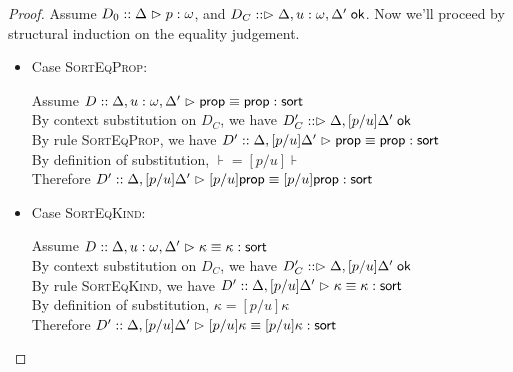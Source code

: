 \begin{proof}
Assume $D_0 :: \judgeA{p}{\omega}$, and $D_C :: \judgeACtx{\Delta, u:\omega, \Delta'}$.  
Now we'll proceed by structural induction on the equality judgement. 
\begin{itemize}
\item Case \textsc{SortEqProp}:
  \begin{tabbedproof}
    \oo Assume $D :: \judgeSortEq[{\Delta, u:\omega, \Delta'}]{\assert}{\assert}$\\
    \ooo By context substitution on $D_C$, we have $D'_C :: \judgeACtx{\Delta, [p/u]\Delta'}$ \\
    \ooo By rule \textsc{SortEqProp}, we have $D' :: \judgeSortEq[{\Delta, [p/u]\Delta'}]{\assert}{\assert}$ \\
    \ooo By definition of substitution, $\assert = [p/u]\assert$ \\
    \ooo Therefore $D' :: \judgeSortEq[{\Delta, [p/u]\Delta'}]{[p/u]\assert}{[p/u]\assert}$ \\
  \end{tabbedproof}

\item Case \textsc{SortEqKind}: 
  \begin{tabbedproof}
    \oo Assume $D :: \judgeSortEq[{\Delta, u:\omega, \Delta'}]{\kappa}{\kappa}$\\
    \ooo By context substitution on $D_C$, we have $D'_C :: \judgeACtx{\Delta, [p/u]\Delta'}$ \\
    \ooo By rule \textsc{SortEqKind}, we have $D' :: \judgeSortEq[{\Delta, [p/u]\Delta'}]{\kappa}{\kappa}$ \\
    \ooo By definition of substitution, $\kappa = [p/u]\kappa$ \\
    \ooo Therefore $D' :: \judgeSortEq[{\Delta, [p/u]\Delta'}]{[p/u]\kappa}{[p/u]\kappa}$ \\
  \end{tabbedproof}


\end{itemize}
\end{proof}

